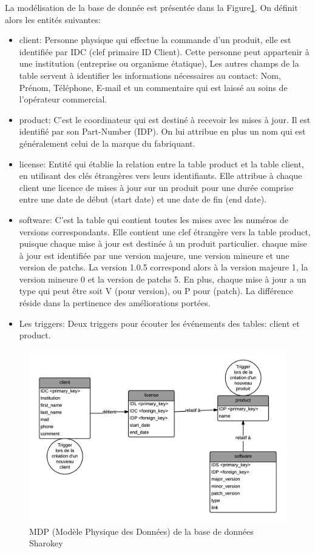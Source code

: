 \documentclass{themeensg}
\begin{document}
La modélisation de la base de donnée est présentée dans la Figure\ref{fig:mpd}. On définit alors les entités suivantes:
\begin{itemize}
\item client: Personne physique qui effectue la commande d'un produit, elle est identifiée par IDC (clef primaire ID Client). Cette personne peut appartenir à une institution (entreprise ou organisme étatique), Les autres champs de la table servent à identifier les informations nécessaires au contact: Nom, Prénom, Téléphone, E-mail et un commentaire qui est laissé au soins de l'opérateur commercial.
\item product: C'est le coordinateur qui est destiné à recevoir les mises à jour. Il est identifié par son Part-Number (IDP). On lui attribue en plus un nom qui est généralement celui de la marque du fabriquant.
\item license: Entité qui établie la relation entre la table product et la table client, en utilisant des clés étrangères vers leurs identifiants. Elle attribue à chaque client une licence de mises à jour sur un produit pour une durée comprise entre une date de début (start date) et une date de fin (end date).
\item software: C'est la table qui contient toutes les mises avec les numéros de versions correspondants. Elle contient une clef étrangère vers la table product, puisque chaque mise à jour est destinée à un produit particulier. chaque mise à jour est identifiée par une version majeure, une version mineure et une version de patchs. La version 1.0.5 correspond alors à la version majeure 1, la version mineure 0 et la version de patchs 5. En plus, chaque mise à jour a un type qui peut être soit V (pour version), ou P pour (patch). La différence réside dans la pertinence des améliorations portées.
\item Les triggers: Deux triggers pour écouter les événements des tables: client et product.
\end{itemize}

\begin{figure}
\centering
\label{fig:mpd}
\includegraphics[scale=0.85]{images/MPD_sharokey.png}
\caption{MDP (Modèle Physique des Données) de la base de données Sharokey}
\end{figure}
\end{document}
